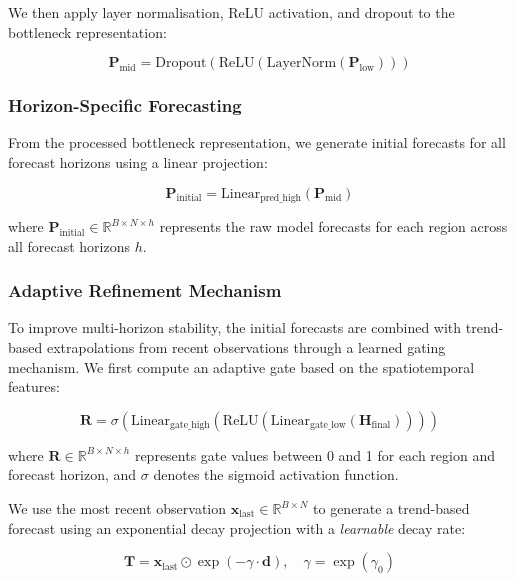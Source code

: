 \documentclass[final,1p,times]{elsarticle}
\begin{document}
We then apply layer normalisation, ReLU activation, and dropout to the bottleneck representation:

\begin{equation}
\mathbf{P}_{\text{mid}} = \text{Dropout}(\text{ReLU}(\text{LayerNorm}(\mathbf{P}_{\text{low}})))
\end{equation}

\subsubsection{Horizon-Specific Forecasting}

From the processed bottleneck representation, we generate initial forecasts for all forecast horizons using a linear projection:

\begin{equation}
\mathbf{P}_{\text{initial}} = \text{Linear}_{\text{pred\_high}}(\mathbf{P}_{\text{mid}})
\end{equation}

where $\mathbf{P}_{\text{initial}} \in \mathbb{R}^{B \times N \times h}$ represents the raw model forecasts for each region across all forecast horizons $h$.

\subsubsection{Adaptive Refinement Mechanism}

To improve multi-horizon stability, the initial forecasts are combined with trend-based extrapolations from recent observations through a learned gating mechanism. We first compute an adaptive gate based on the spatiotemporal features:

\begin{equation}
\mathbf{R} = \sigma(\text{Linear}_{\text{gate\_high}}(\text{ReLU}(\text{Linear}_{\text{gate\_low}}(\mathbf{H}_{\text{final}}))))
\end{equation}

where $\mathbf{R} \in \mathbb{R}^{B \times N \times h}$ represents gate values between 0 and 1 for each region and forecast horizon, and $\sigma$ denotes the sigmoid activation function.

We use the most recent observation $\mathbf{x}_{\text{last}} \in \mathbb{R}^{B \times N}$ to generate a trend-based forecast using an exponential decay projection with a \emph{learnable} decay rate:

\begin{equation}
\mathbf{T} = \mathbf{x}_{\text{last}} \odot \exp(-\gamma \cdot \mathbf{d}), \quad \gamma = \exp(\gamma_0)
\end{equation}
\end{document}
